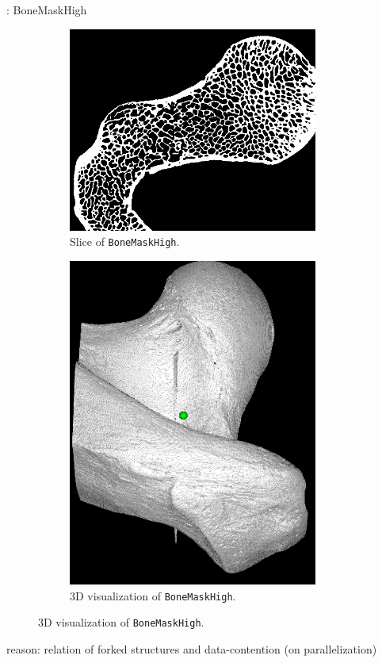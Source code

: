 \documentclass{beamer}
\begin{document}
\begin{frame}{\insertsubsection: BoneMaskHigh}
\begin{figure}
\centering
  \begin{subfigure}[b]{.5\textwidth}
  \centering
  \includegraphics[width=0.9\textwidth]{images/bonemaskhigh_slice_unprocessed.png}
  \caption{Slice of \texttt{BoneMaskHigh}.}
  \end{subfigure}%
  \begin{subfigure}[b]{.5\textwidth}
  \centering
  \includegraphics[width=0.9\textwidth]{images/bonemaskhigh_unprocessed.png}
  \caption{3D visualization of \texttt{BoneMaskHigh}.}
  \end{subfigure}
\end{figure}
  reason: relation of forked structures and data-contention (on parallelization)
\end{frame}
\end{document}

